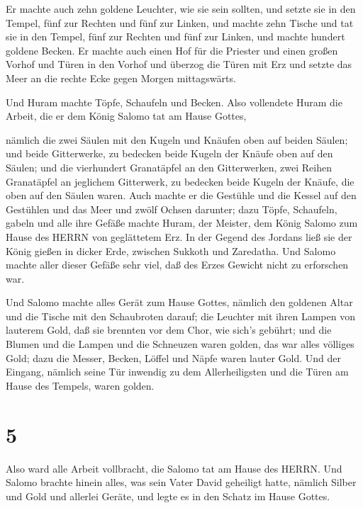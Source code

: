  Er machte auch zehn goldene Leuchter, wie sie sein sollten,
und setzte sie in den Tempel, fünf zur Rechten und fünf zur Linken,
 und machte zehn Tische und tat sie in den Tempel, fünf zur
Rechten und fünf zur Linken, und machte hundert goldene Becken.
 Er machte auch einen Hof für die Priester und einen großen
Vorhof und Türen in den Vorhof und überzog die Türen mit Erz
 und setzte das Meer an die rechte Ecke gegen Morgen
mittagswärts.

 Und Huram machte Töpfe, Schaufeln und Becken. Also
vollendete Huram die Arbeit, die er dem König Salomo tat am Hause
Gottes,

 nämlich die zwei Säulen mit den Kugeln und Knäufen oben
auf beiden Säulen; und beide Gitterwerke, zu bedecken beide Kugeln der
Knäufe oben auf den Säulen;  und die vierhundert
Granatäpfel an den Gitterwerken, zwei Reihen Granatäpfel an jeglichem
Gitterwerk, zu bedecken beide Kugeln der Knäufe, die oben auf den Säulen
waren.  Auch machte er die Gestühle und die Kessel auf den
Gestühlen  und das Meer und zwölf Ochsen darunter;
 dazu Töpfe, Schaufeln, gabeln und alle ihre Gefäße machte
Huram, der Meister, dem König Salomo zum Hause des HERRN von geglättetem
Erz.  In der Gegend des Jordans ließ sie der König gießen
in dicker Erde, zwischen Sukkoth und Zaredatha.  Und Salomo
machte aller dieser Gefäße sehr viel, daß des Erzes Gewicht nicht zu
erforschen war.

 Und Salomo machte alles Gerät zum Hause Gottes, nämlich
den goldenen Altar und die Tische mit den Schaubroten darauf;
 die Leuchter mit ihren Lampen von lauterem Gold, daß sie
brennten vor dem Chor, wie sich's gebührt;  und die Blumen
und die Lampen und die Schneuzen waren golden, das war alles völliges
Gold;  dazu die Messer, Becken, Löffel und Näpfe waren
lauter Gold. Und der Eingang, nämlich seine Tür inwendig zu dem
Allerheiligsten und die Türen am Hause des Tempels, waren golden.

\hypertarget{section-4}{%
\section{5}\label{section-4}}

 Also ward alle Arbeit vollbracht, die Salomo tat am Hause
des HERRN. Und Salomo brachte hinein alles, was sein Vater David
geheiligt hatte, nämlich Silber und Gold und allerlei Geräte, und legte
es in den Schatz im Hause Gottes.

